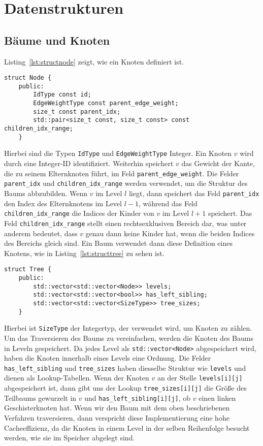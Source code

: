 \section{Datenstrukturen}
\subsection{Bäume und Knoten}
Listing~\ref{lst:structnode} zeigt, wie ein Knoten definiert ist.
\begin{lstlisting}[caption={Definition von \texttt{struct Node}}, label={lst:structnode}]
struct Node {
    public:
        IdType const id;
        EdgeWeightType const parent_edge_weight;
        size_t const parent_idx;
        std::pair<size_t const, size_t const> const children_idx_range;
    }
\end{lstlisting}

Hierbei sind die Typen \texttt{IdType} und \texttt{EdgeWeightType} Integer.
Ein Knoten $v$ wird durch eine Integer-ID identifiziert. 
Weiterhin speichert $v$ das Gewicht der Kante, die zu seinem Elternknoten führt, im Feld \texttt{parent\_edge\_weight}.
Die Felder \texttt{parent\_idx} und \texttt{children\_idx\_range} werden verwendet, um die Struktur des Baums abbzubilden.
Wenn $v$ im Level $l$ liegt, dann speichert das Feld \texttt{parent\_idx} den Index des Elternknotens im Level $l-1$, während das Feld \texttt{children\_idx\_range} die Indices der Kinder von $v$ im Level $l+1$ speichert.
Das Feld \texttt{children\_idx\_range} stellt einen rechtsexklusiven Bereich dar, was unter anderem bedeutet, dass $v$ genau dann keine Kinder hat, wenn die beiden Indices des Bereichs gleich sind.
Ein Baum verwendet dann diese Definition eines Knotens, wie in Listing~\ref{lst:structtree} zu sehen ist.

\begin{lstlisting}[caption={Definition von \texttt{struct Tree}}, label={lst:structtree}]
struct Tree {
    public:
        std::vector<std::vector<Node>> levels;
        std::vector<std::vector<bool>> has_left_sibling;
        std::vector<std::vector<SizeType>> tree_sizes;
    }
\end{lstlisting}
 Hierbei ist \texttt{SizeType} der Integertyp, der verwendet wird, um Knoten zu zählen.
Um das Traversieren des Baums zu vereinfachen, werden die Knoten des Baums in Leveln gespeichert.
Da jedes Level als \texttt{std::vector<Node>} abgespeichert wird, haben die Knoten innerhalb eines Levels eine Ordnung.
Die Felder \texttt{has\_left\_sibling} und \texttt{tree\_sizes} haben diesselbe Struktur wie \texttt{levels} und dienen als Lookup-Tabellen.
Wenn der Knoten $v$ an der Stelle \texttt{levels[i][j]} abgespeichert ist, dann gibt uns der Lookup \texttt{tree\_sizes[i][j]} die Größe des Teilbaums gewurzelt in $v$ und \texttt{has\_left\_sibling[i][j]}, ob $v$ einen linken Geschisterknoten hat.
Wenn wir den Baum mit dem oben beschriebenen Verfahren traversieren, dann verspricht diese Implementierung eine hohe Cacheeffizienz, da die Knoten in einem Level in der selben Reihenfolge besucht werden, wie sie im Speicher abgelegt sind.

